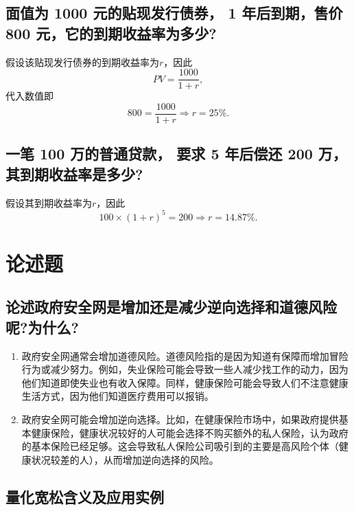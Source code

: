 \documentclass{article}
\begin{document}
\subsection{面值为 1000 元的贴现发行债券， 1 年后到期，售价 800 元，它的到期收益率为多少?}

假设该贴现发行债券的到期收益率为$r$，因此
\begin{equation*}
    PV = \frac{1000}{1+r},
\end{equation*}
代入数值即
\begin{equation*}
    800 = \frac{1000}{1+r} \Rightarrow r = 25\%.
\end{equation*}

\subsection{一笔 100 万的普通贷款， 要求 5 年后偿还 200 万， 其到期收益率是多少?}

假设其到期收益率为$r$，因此
\begin{equation*}
    100\times (1+r)^5 = 200 \Rightarrow r = 14.87\%.
\end{equation*}

\section{论述题}

\subsection{论述政府安全网是增加还是减少逆向选择和道德风险呢?为什么?}
\begin{enumerate}
    \item 政府安全网通常会增加道德风险。道德风险指的是因为知道有保障而增加冒险行为或减少努力。例如，失业保险可能会导致一些人减少找工作的动力，因为他们知道即使失业也有收入保障。同样，健康保险可能会导致人们不注意健康生活方式，因为他们知道医疗费用可以报销。
    \item 政府安全网可能会增加逆向选择。比如，在健康保险市场中，如果政府提供基本健康保险，健康状况较好的人可能会选择不购买额外的私人保险，认为政府的基本保险已经足够。这会导致私人保险公司吸引到的主要是高风险个体（健康状况较差的人），从而增加逆向选择的风险。
\end{enumerate}

\subsection{量化宽松含义及应用实例}
\end{document}
